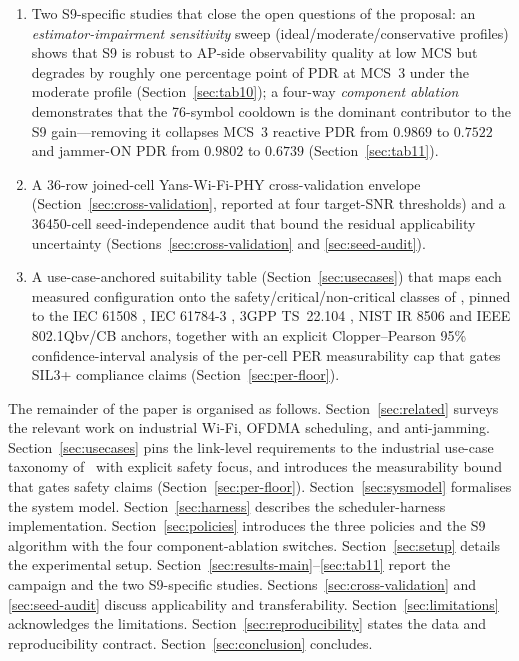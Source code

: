 \documentclass[journal,onecolumn,11pt,a4paper]{IEEEtran}
\begin{document}
\begin{enumerate}
  \item Two S9-specific studies that close the open questions of the
        proposal: an \emph{estimator-impairment sensitivity} sweep
        (ideal/moderate/conservative profiles) shows that S9 is robust
        to AP-side observability quality at low MCS but degrades by
        roughly one percentage point of PDR at MCS~3 under the moderate
        profile (Section~\ref{sec:tab10}); a four-way \emph{component
        ablation} demonstrates that the \SI{76}{}-symbol cooldown is the
        dominant contributor to the S9 gain---removing it collapses
        MCS~3 reactive PDR from $0.9869$ to $0.7522$ and jammer-ON PDR
        from $0.9802$ to $0.6739$ (Section~\ref{sec:tab11}).
  \item A 36-row joined-cell Yans-Wi-Fi-PHY cross-validation envelope
        (Section~\ref{sec:cross-validation}, reported at four
        target-SNR thresholds) and a
        \num{36450}-cell seed-independence audit that bound the
        residual applicability uncertainty
        (Sections~\ref{sec:cross-validation} and \ref{sec:seed-audit}).
  \item A use-case-anchored suitability table
        (Section~\ref{sec:usecases}) that maps each measured
        configuration onto the safety/critical/non-critical classes
        of \cite{Fan22}, pinned to the IEC 61508
        \cite{IEC61508,Gal08}, IEC 61784-3 \cite{IEC61784},
        3GPP TS~22.104 \cite{TS22104}, NIST IR 8506
        \cite{Mon24} and IEEE 802.1Qbv/CB \cite{IEEE802Qbv,IEEE802CB}
        anchors, together with an explicit Clopper--Pearson 95\%
        confidence-interval analysis of the per-cell PER
        measurability cap that gates SIL3+ compliance claims
        (Section~\ref{sec:per-floor}).
\end{enumerate}

The remainder of the paper is organised as follows.
Section~\ref{sec:related} surveys the relevant work on industrial
Wi-Fi, OFDMA scheduling, and anti-jamming.
Section~\ref{sec:usecases} pins the link-level requirements to the
industrial use-case taxonomy of~\cite{Fan22} with explicit safety
focus, and introduces the measurability bound that gates safety
claims (Section~\ref{sec:per-floor}).
Section~\ref{sec:sysmodel} formalises the system model.
Section~\ref{sec:harness} describes the scheduler-harness
implementation. Section~\ref{sec:policies} introduces the three
policies and the S9 algorithm with the four component-ablation
switches. Section~\ref{sec:setup} details the experimental setup.
Section~\ref{sec:results-main}--\ref{sec:tab11} report the campaign and
the two S9-specific studies. Sections~\ref{sec:cross-validation} and
\ref{sec:seed-audit} discuss applicability and transferability.
Section~\ref{sec:limitations} acknowledges the limitations.
Section~\ref{sec:reproducibility} states the data and reproducibility
contract. Section~\ref{sec:conclusion} concludes.
\end{document}
